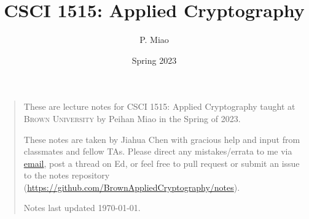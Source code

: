 \documentclass[letterpaper, 11pt, colorful, sections]{cs1515}
\title{CSCI 1515: Applied Cryptography}
\author{P. Miao}
\date{Spring 2023}
\numberwithin{equation}{section}
\begin{document}
\maketitle
\begin{quote}
    \quad These are lecture notes for CSCI 1515: Applied Cryptography taught at \textsc{Brown University} by Peihan Miao in the Spring of 2023.

    \quad These notes are taken by Jiahua Chen with gracious help and input from classmates and fellow TAs. Please direct any mistakes/errata to me via \href{mailto:jiahua_chen2@brown.edu}{email}, post a thread on Ed, or feel free to pull request or submit an issue to the notes repository (\url{https://github.com/BrownAppliedCryptography/notes}).

    \quad Notes last updated \today.
\end{quote}
\tableofcontents
% 
% 

\newpage









\end{document}
